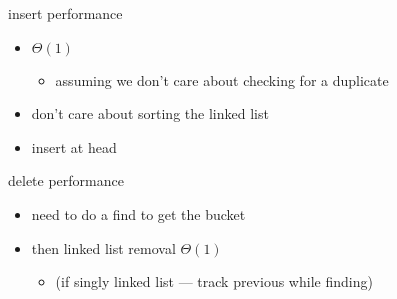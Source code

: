 \begin{frame}{insert performance}
\lstset{language=C++,style=small}
\begin{itemize}
\item $\Theta(1)$
    \begin{itemize}
    \item assuming we don't care about checking for a duplicate
    \end{itemize}
\item don't care about sorting the linked list
\item insert at head
\end{itemize}
\end{frame}

\begin{frame}{delete performance}
\begin{itemize}
\item need to do a find to get the bucket
\item then linked list removal $\Theta(1)$
\begin{itemize}
    \item (if singly linked list --- track previous while finding)
\end{itemize}
\end{itemize}
\end{frame}
